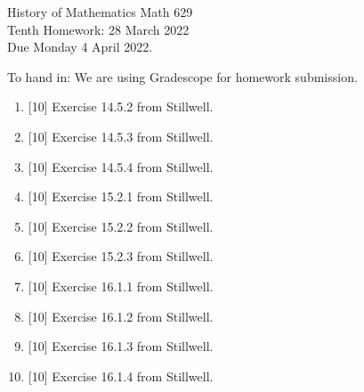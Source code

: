 \documentclass[12pt]{article}
\begin{document}
\LARGE 
\noindent
{\color{Maroon}History of Mathematics \hfill Math 629}\vspace{2pt}\\
\large
Tenth Homework: \hfill 28 March 2022\\
Due Monday 4 April 2022.
\normalsize\vspace{10pt}

To hand in: We are using Gradescope for homework submission.


\begin{enumerate}

\item  {[10]}
     Exercise 14.5.2 from Stillwell.
\item  {[10]}
     Exercise 14.5.3 from Stillwell.
\item  {[10]}
     Exercise 14.5.4 from Stillwell.


\item  {[10]}
     Exercise 15.2.1 from Stillwell.
\item  {[10]}
     Exercise 15.2.2 from Stillwell.
\item  {[10]}
     Exercise 15.2.3 from Stillwell.


\item  {[10]}
     Exercise 16.1.1 from Stillwell.
\item  {[10]}
     Exercise 16.1.2 from Stillwell.
\item  {[10]}
     Exercise 16.1.3 from Stillwell.
\item  {[10]}
     Exercise 16.1.4 from Stillwell.


  \end{enumerate}
\end{document}
